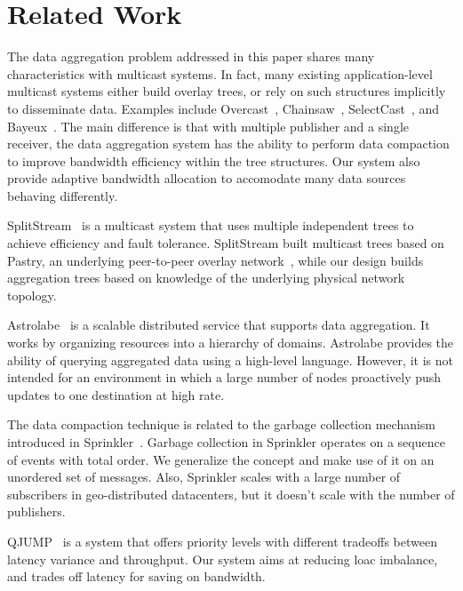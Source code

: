 \section{Related Work}\label{sec:related}

The data aggregation problem addressed in this paper shares many
characteristics with multicast systems.  In fact, many existing
application-level multicast systems either build overlay trees, or rely on such
structures implicitly to disseminate data.  Examples include
Overcast~\cite{JGJK00}, Chainsaw~\cite{PKTSM05}, SelectCast~\cite{BvRD03}, and
Bayeux~\cite{ZZJKK01}.  The main difference is that with multiple publisher
and a single receiver, the data aggregation system has the ability to perform
data compaction to improve bandwidth efficiency within the tree structures.
Our system also provide adaptive bandwidth allocation to accomodate many data
sources behaving differently.

SplitStream~\cite{CDKNRS03} is a multicast system that uses multiple
independent trees to achieve efficiency and fault tolerance.  SplitStream built
multicast trees based on Pastry, an underlying peer-to-peer overlay
network~\cite{RD01}, while our design builds aggregation trees based on
knowledge of the underlying physical network topology.

Astrolabe~\cite{vRBV03} is a scalable distributed service that supports data
aggregation.  It works by organizing resources into a hierarchy of domains.
Astrolabe provides the ability of querying aggregated data using a high-level
language.  However, it is not intended for an environment in which a large
number of nodes proactively push updates to one destination at high rate.

The data compaction technique is related to the garbage collection mechanism
introduced in Sprinkler~\cite{GvR13}.  Garbage collection in Sprinkler operates
on a sequence of events with total order.  We generalize the concept and make
use of it on an unordered set of messages.  Also, Sprinkler scales with a large
number of subscribers in geo-distributed datacenters, but it doesn't scale with
the number of publishers.

QJUMP~\cite{QJUMP15} is a system that offers priority levels with different
tradeoffs between latency variance and throughput.  Our system aims at reducing
loac imbalance, and trades off latency for saving on bandwidth.

